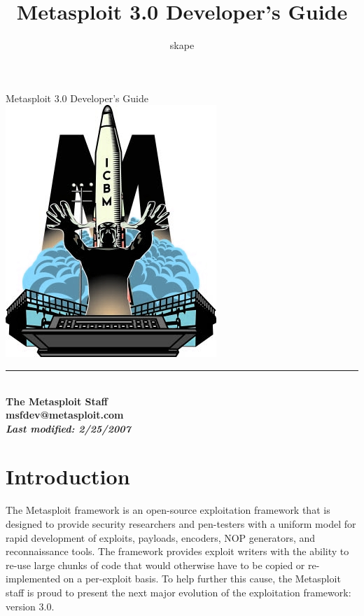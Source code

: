 \documentclass{report}
\begin{document}
\title{Metasploit 3.0 Developer's Guide}
\author{skape}

\begin{titlepage}
    \begin{center}
        \huge{{Metasploit 3.0 Developer's Guide}} \\[10mm]
        \includegraphics{logo} \\[15mm]
        \rule{10cm}{1pt} \\[8mm]
        \small\bf{The Metasploit Staff} \\
        \small\bf{msfdev@metasploit.com} \\[4mm]
        \textit{Last modified: \small{2/25/2007}}
    \end{center}
\end{titlepage}

\tableofcontents

\setlength{\parindent}{0pt} \setlength{\parskip}{8pt}

\chapter{Introduction}

\par
The Metasploit framework is an open-source exploitation framework
that is designed to provide security researchers and pen-testers
with a uniform model for rapid development of exploits, payloads,
encoders, NOP generators, and reconnaissance tools.  The framework
provides exploit writers with the ability to re-use large chunks of
code that would otherwise have to be copied or re-implemented on a
per-exploit basis.  To help further this cause, the Metasploit staff
is proud to present the next major evolution of the exploitation
framework: version 3.0.
\end{document}

